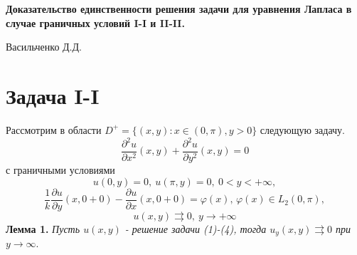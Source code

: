 \documentclass[12pt, a4paper]{article}
\author{Васильченко Д.Д.}
\begin{document}
	
	\begin{center}
		\Large\bfseries
		Доказательство единственности решения задачи для уравнения Лапласа в случае граничных условий I-I  и II-II.
	\end{center}
	
		\begin{center}
		\large Васильченко Д.Д.
	\end{center}
	\vspace{1cm}
	
	\section{Задача I-I}
	Рассмотрим в области $D^+ = \{(x,y): x \in (0,\pi), y > 0\}$ следующую задачу.
	\begin{equation}
		\dfrac{\partial^2 u}{\partial x^2}(x,y) + \dfrac{\partial^2 u}{\partial y^2}(x,y) = 0
	\end{equation}
	с граничными условиями 
	\begin{equation}
		u(0,y) = 0, \ u(\pi, y) = 0, \ 0 < y < +\infty, 
	\end{equation}
	\begin{equation}
		\dfrac{1}{k} \dfrac{\partial u}{\partial y}(x,0+0) - \dfrac{\partial u}{\partial x}(x,0+0) = \varphi(x), \,\varphi(x) \in L_2(0,\pi),
	\end{equation}
	\begin{equation}
		u(x,y) \rightrightarrows 0, \ y \to +\infty 
	\end{equation}
			\textbf{Лемма 1.} \textit{Пусть $u(x,y)$ - решение задачи (1)-(4), тогда $u_y(x,y) \rightrightarrows 0$ при $ y \to \infty$}.
	
\end{document}
